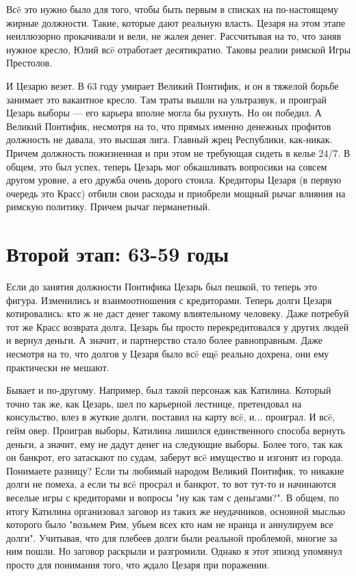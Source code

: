 Всë это нужно было для того, чтобы быть первым в списках на по-настоящему жирные должности. Такие, которые дают реальную власть. Цезаря на этом этапе неиллюзорно прокачивали и вели, не жалея денег. Рассчитывая на то, что заняв нужное кресло, Юлий всë отработает десятикратно. Таковы реалии римской Игры Престолов.


И Цезарю везет. В 63 году умирает Великий Понтифик, и он в тяжелой борьбе занимает это вакантное кресло. Там траты вышли на ультразвук, и проиграй Цезарь выборы — его карьера вполне могла бы рухнуть. Но он победил. А Великий Понтифик, несмотря на то, что прямых именно денежных профитов должность не давала, это высшая лига. Главный жрец Республики, как-никак. Причем должность пожизненная и при этом не требующая сидеть в келье 24/7. В общем, это был успех, теперь Цезарь мог обкашливать вопросики на совсем другом уровне, а его дружба очень дорого стоила. Кредиторы Цезаря (в первую очередь это Красс) отбили свои расходы и приобрели мощный рычаг влияния на римскую политику. Причем рычаг перманетный.

\section{Второй этап: 63-59 годы}

Если до занятия должности Понтифика Цезарь был пешкой, то теперь это фигура. Изменились и взаимоотношения с кредиторами. Теперь долги Цезаря котировались: кто ж не даст денег такому влиятельному человеку. Даже потребуй тот же Красс возврата долга, Цезарь бы просто перекредитовался у других людей и вернул деньги. А значит, и партнерство стало более равноправным. Даже несмотря на то, что долгов у Цезаря было всë ещë реально дохрена, они ему практически не мешают.


Бывает и по-другому. Например, был такой персонаж как Катилина. Который точно так же, как Цезарь, шел по карьерной лестнице, претендовал на консульство, влез в жуткие долги, поставил на карту всë, и... проиграл. И всë, гейм овер. Проиграв выборы, Катилина лишился единственного способа вернуть деньги, а значит, ему не дадут денег на следующие выборы. Более того, так как он банкрот, его затаскают по судам, заберут всë имущество и изгонят из города. Понимаете разницу? Если ты любимый народом Великий Понтифик, то никакие долги не помеха, а если ты всë просрал и банкрот, то вот тут-то и начинаются веселые игры с кредиторами и вопросы "ну как там с деньгами?". В общем, по итогу Катилина организовал заговор из таких же неудачников, основной мыслью которого было "возьмем Рим, убьем всех кто нам не нраица и аннулируем все долги". Учитывая, что для плебеев долги были реальной проблемой, многие за ним пошли. Но заговор раскрыли и разгромили. Однако я этот эпизод упомянул просто для понимания того, что ждало Цезаря при поражении.


